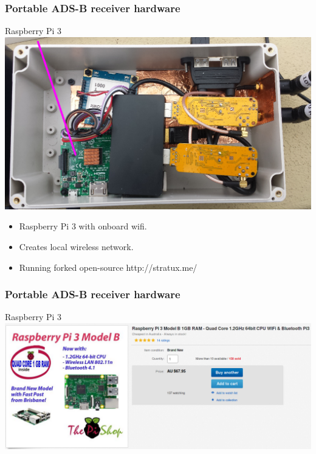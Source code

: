 \begin{frame}
\frametitle{Portable ADS-B receiver hardware}
\begin{block}{Raspberry Pi 3}
\includegraphics[height=0.5\textheight]{image/adsb-hardware-rpi3.png}
\begin{itemize}
\item Raspberry Pi 3 with onboard wifi.
\item Creates local wireless network.
\item Running forked open-source http://stratux.me/
\end{itemize}
\end{block}
\end{frame}

\begin{frame}
\frametitle{Portable ADS-B receiver hardware}
\begin{block}{Raspberry Pi 3}
\includegraphics[height=0.4\textheight]{image/ebay-rpi3.png}
\end{block}
\end{frame}

